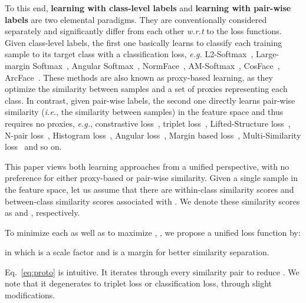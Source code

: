 \documentclass[10pt,twocolumn,letterpaper]{article}
\begin{document}
To this end, \textbf{learning with class-level labels} and \textbf{learning with pair-wise labels} are two elemental  paradigms. They are conventionally considered separately and significantly differ from each other \emph{w.r.t} to the loss functions. Given class-level labels, the first one basically learns to classify each training sample to its target class with a classification loss, \textit{e.g.} L2-Softmax~\cite{ranjan2017l2}, Large-margin Softmax~\cite{liu2017sphereface}, Angular Softmax~\cite{Liu2016LargeMarginSL}, NormFace~\cite{wang2017normface}, AM-Softmax~\cite{wang2018additive}, CosFace~\cite{Wang_2018_CVPR}, ArcFace~\cite{deng2019arcface}. These methods are also known as proxy-based learning, as they optimize the similarity between samples and a set of proxies representing each class. 
In contrast, given pair-wise labels, the second one directly learns pair-wise similarity (\emph{i.e.}, the similarity between samples) in the feature space and thus requires no proxies, \emph{e.g.}, constrastive loss~\cite{hadsell2006dimensionality,chopra2005learning}, triplet loss~\cite{hoffer2015deep, schroff2015facenet}, Lifted-Structure loss~\cite{oh2016deep}, N-pair loss~\cite{Sohn2016ImprovedDM}, Histogram loss~\cite{Ustinova2016LearningDE}, Angular loss~\cite{Wang2017DeepML}, Margin based loss~\cite{wu2017sampling},  Multi-Similarity loss~\cite{wang2019multi} and so on. 

This paper views both learning approaches from a unified perspective, with no preference for either proxy-based or pair-wise similarity. 
Given a single sample  in the feature space, let us assume that there are  within-class similarity scores and  between-class similarity scores associated with . We denote these similarity scores as  and , respectively. 

To minimize each  as well as to maximize , , we propose a unified loss function by:
 
in which  is a scale factor and  is a margin for better similarity separation. 

Eq.~\ref{eq:proto} is intuitive. It iterates through every similarity pair to reduce . 
We note that it degenerates to triplet loss or classification loss, through slight modifications.
\end{document}
